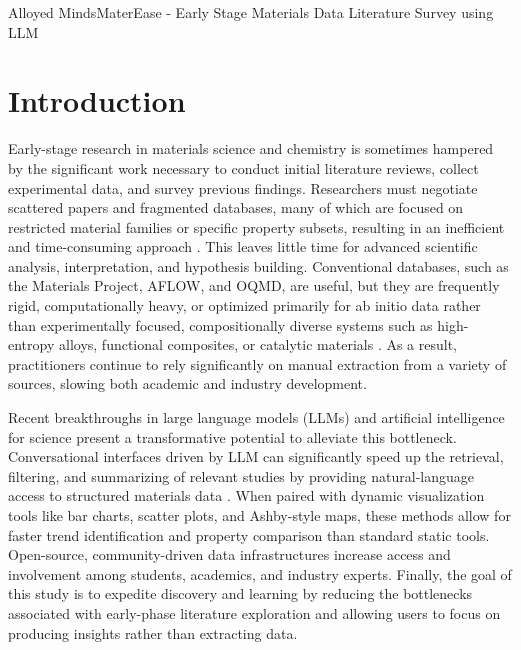 \begin{teamsubmission}{Alloyed Minds}{MaterEase - Early Stage Materials Data Literature Survey using LLM}

\section*{Introduction}
Early-stage research in materials science and chemistry is sometimes hampered by the significant work necessary to conduct initial literature reviews, collect experimental data, and survey previous findings.  Researchers must negotiate scattered papers and fragmented databases, many of which are focused on restricted material families or specific property subsets, resulting in an inefficient and time-consuming approach \cite{jain2013commentary}.  This leaves little time for advanced scientific analysis, interpretation, and hypothesis building.  Conventional databases, such as the Materials Project, AFLOW, and OQMD, are useful, but they are frequently rigid, computationally heavy, or optimized primarily for ab initio data rather than experimentally focused, compositionally diverse systems such as high-entropy alloys, functional composites, or catalytic materials \cite{kaufmann2020searching}.  As a result, practitioners continue to rely significantly on manual extraction from a variety of sources, slowing both academic and industry development.

Recent breakthroughs in large language models (LLMs) and artificial intelligence for science present a transformative potential to alleviate this bottleneck.  Conversational interfaces driven by LLM can significantly speed up the retrieval, filtering, and summarizing of relevant studies by providing natural-language access to structured materials data \cite{lei2024materials,gromski2019explore}.  When paired with dynamic visualization tools like bar charts, scatter plots, and Ashby-style maps, these methods allow for faster trend identification and property comparison than standard static tools.  Open-source, community-driven data infrastructures increase access and involvement among students, academics, and industry experts.  Finally, the goal of this study is to expedite discovery and learning by reducing the bottlenecks associated with early-phase literature exploration and allowing users to focus on producing insights rather than extracting data.



\end{teamsubmission}
